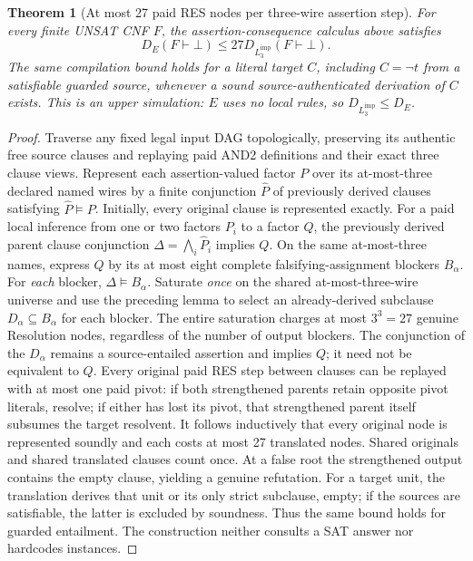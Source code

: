\documentclass[11pt]{article}
\newtheorem{theorem}{Theorem}
\begin{document}
\begin{theorem}[At most 27 paid RES nodes per three-wire assertion step]
For every finite UNSAT CNF $F$, the assertion-consequence calculus above satisfies
\[
\boxed{ D_{E}(F\vdash\bot)\le
27 D_{L_3^{\mathrm{imp}}}(F\vdash\bot). }\tag{1}
\]
The same compilation bound holds for a literal target $C$, including $C=\neg t$ from a satisfiable guarded source, whenever a sound source-authenticated derivation of $C$ exists. This is an \emph{upper} simulation: $E$ uses no local rules, so $D_{L_3^{\mathrm{imp}}}\le D_E$.
\end{theorem}
\begin{proof}
Traverse any fixed legal input DAG topologically, preserving its authentic free source clauses and replaying paid AND2 definitions and their exact three clause views. Represent each assertion-valued factor $P$ over its at-most-three declared named wires by a finite conjunction $\widehat P$ of previously derived clauses satisfying $\widehat P\models P$. Initially, every original clause is represented exactly. For a paid local inference from one or two factors $P_i$ to a factor $Q$, the previously derived parent clause conjunction $\Delta=\bigwedge_i\widehat P_i$ implies $Q$. On the same at-most-three names, express $Q$ by its at most eight complete falsifying-assignment blockers $B_\alpha$. For \emph{each} blocker, $\Delta\models B_\alpha$. Saturate \emph{once} on the shared at-most-three-wire universe and use the preceding lemma to select an already-derived subclause $D_\alpha\subseteq B_\alpha$ for each blocker. The entire saturation charges at most $3^3=27$ genuine Resolution nodes, regardless of the number of output blockers. The conjunction of the $D_\alpha$ remains a source-entailed assertion and implies $Q$; it need not be equivalent to $Q$. Every original paid RES step between clauses can be replayed with at most one paid pivot: if both strengthened parents retain opposite pivot literals, resolve; if either has lost its pivot, that strengthened parent itself subsumes the target resolvent. It follows inductively that every original node is represented soundly and each costs at most 27 translated nodes. Shared originals and shared translated clauses count once. At a false root the strengthened output contains the empty clause, yielding a genuine refutation. For a target unit, the translation derives that unit or its only strict subclause, empty; if the sources are satisfiable, the latter is excluded by soundness. Thus the same bound holds for guarded entailment. The construction neither consults a SAT answer nor hardcodes instances.
\end{proof}
\end{document}
